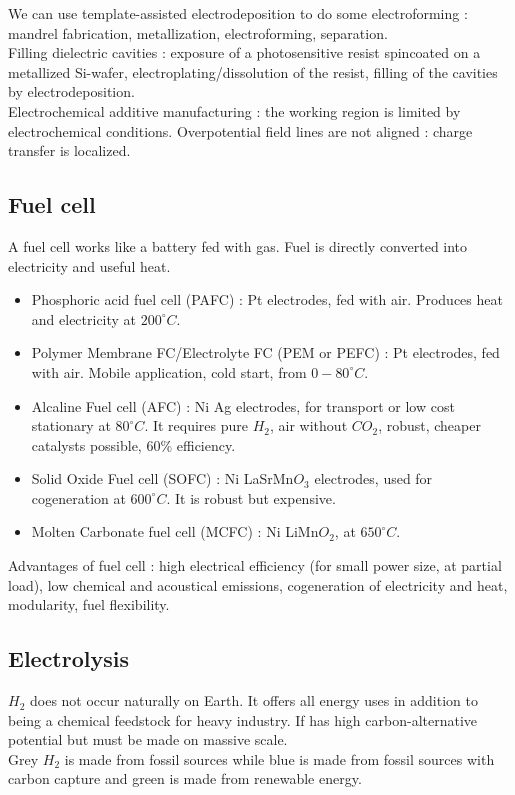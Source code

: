 \documentclass[../main.tex]{subfiles}
\begin{document}
We can use template-assisted electrodeposition to do some electroforming : mandrel fabrication, metallization, electroforming, separation. \\
Filling dielectric cavities : exposure of a photosensitive resist spincoated on a metallized Si-wafer, electroplating/dissolution of the resist, filling of the cavities by electrodeposition. \\
Electrochemical additive manufacturing : the working region is limited by electrochemical conditions. Overpotential field lines are not aligned : charge transfer is localized. \\

\subsection{Fuel cell}
A fuel cell works like a battery fed with gas. Fuel is directly converted into electricity and useful heat.\\
\begin{itemize}
    \item Phosphoric acid fuel cell (PAFC) : Pt electrodes, fed with air. Produces heat and electricity at $200^\circ C$. 
    \item Polymer Membrane FC/Electrolyte FC (PEM or PEFC) : Pt electrodes, fed with air. Mobile application, cold start, from $0-80^\circ C$.
    \item Alcaline Fuel cell (AFC) : Ni Ag electrodes, for transport or low cost stationary at $80^\circ C$. It requires pure $H_2$, air without $CO_2$, robust, cheaper catalysts possible, $60\%$ efficiency.
    \item Solid Oxide Fuel cell (SOFC) : Ni LaSrMn$O_3$ electrodes, used for cogeneration at $600^\circ C$. It is robust but expensive.
    \item Molten Carbonate fuel cell (MCFC) : Ni LiMn$O_2$, at $650^\circ C$.
\end{itemize}

Advantages of fuel cell : high electrical efficiency (for small power size, at partial load), low chemical and acoustical emissions, cogeneration of electricity and heat, modularity, fuel flexibility. 

\subsection{Electrolysis}
$H_2$ does not occur naturally on Earth. It offers all energy uses in addition to being a chemical feedstock for heavy industry. If has high carbon-alternative potential but must be made on massive scale.\\
Grey $H_2$ is made from fossil sources while blue is made from fossil sources with carbon capture and green is made from renewable energy.\\
\end{document}
